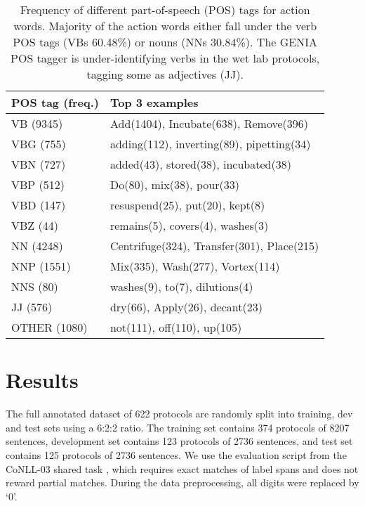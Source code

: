 \documentclass[11pt,a4paper]{article}
\begin{document}
\begin{table}[htp]
    \centering
    \small
    \begin{tabular}{|l|l|}
        \hline
        POS tag {\tiny(freq.)}& Top 3 examples \\
        \hline
        VB {\tiny(9345)}  & Add{\tiny(1404)}, Incubate{\tiny(638)}, Remove{\tiny(396)} \\
        VBG {\tiny(755)}   & adding{\tiny(112)}, inverting{\tiny(89)}, pipetting{\tiny(34)} \\
        VBN {\tiny(727)}   & added{\tiny(43)}, stored{\tiny(38)}, incubated{\tiny(38)} \\
        VBP {\tiny(512)}   & Do{\tiny(80)}, mix{\tiny(38)}, pour{\tiny(33)} \\
        VBD {\tiny(147)}   & resuspend{\tiny(25)}, put{\tiny(20)}, kept{\tiny(8)}  \\
        VBZ {\tiny(44)}    & remains{\tiny(5)}, covers{\tiny(4)}, washes{\tiny(3)} \\
        NN  {\tiny(4248)}  & Centrifuge{\tiny(324)}, Transfer{\tiny(301)}, Place{\tiny(215)} \\
        NNP {\tiny(1551)}  & Mix{\tiny(335)}, Wash{\tiny(277)}, Vortex{\tiny(114)} \\
        NNS {\tiny(80)}    & washes{\tiny(9)}, to{\tiny(7)}, dilutions{\tiny(4)} \\
        JJ  {\tiny(576)}   & dry{\tiny(66)}, Apply{\tiny(26)}, decant{\tiny(23)} \\
        OTHER {\tiny(1080)}   & not{\tiny(111)}, off{\tiny(110)}, up{\tiny(105)} \\
        \hline
    \end{tabular}
    \caption{ Frequency of different part-of-speech (POS) tags for action words. Majority of the action words either fall under the verb POS tags (VBs 60.48\%) or nouns (NNs 30.84\%). The GENIA POS tagger is under-identifying verbs in the wet lab protocols, tagging some as adjectives (JJ).}
    \label{tab:pos_freq}
\end{table}


\section{Results}
\label{results}
The full annotated dataset of 622 protocols are randomly split into training, dev and test sets using a 6:2:2 ratio. The training set contains 374 protocols of 8207 sentences, development set contains 123 protocols of 2736 sentences, and test set contains 125 protocols of 2736 sentences. We use the evaluation script from the CoNLL-03 shared task \cite{tjong2003introduction}, which requires exact matches of label spans and does not reward partial matches. During the data preprocessing, all digits were replaced by `0'.  
\end{document}

